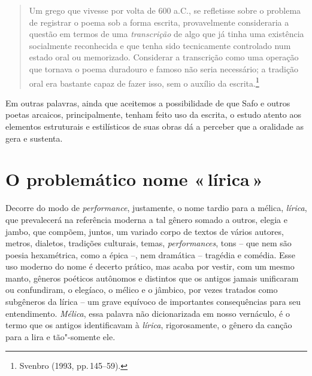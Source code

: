 \begin{quote}
Um grego que vivesse por volta de 600 a.C., se refletisse sobre o problema de
registrar o poema sob a forma escrita, provavelmente consideraria a questão em
termos de uma \textit{transcrição} de algo que já tinha uma existência
socialmente reconhecida e que tenha sido tecnicamente controlado num estado
oral ou memorizado. Considerar a transcrição como uma operação que tornava o
poema duradouro e famoso não seria necessário; a tradição oral era bastante
capaz de fazer isso, sem o auxílio da escrita.\footnote{ Svenbro (1993, pp.\,145--59).}
\end{quote}

Em outras palavras, ainda que aceitemos a possibilidade de que Safo e outros
poetas arcaicos, principalmente, tenham feito uso da escrita, o estudo atento
aos elementos estruturais e estilísticos de suas obras dá a perceber que a oralidade as gera e
sustenta.

\section*{O problemático nome «\,lírica\,»}

Decorre do modo de \textit{performance}, justamente, o nome tardio para a mélica,
\textit{lírica}, que prevalecerá na referência moderna a tal gênero somado a outros, elegia e jambo, que compõem, juntos, um variado corpo de
textos de vários autores, metros, dialetos, tradições culturais, temas,
\textit{performances}, tons -- que nem são poesia hexamétrica, como a
épica --, nem dramática -- tragédia e comédia. Esse uso moderno do nome é decerto
prático, mas acaba por vestir, com um mesmo manto,
gêneros poéticos autônomos e distintos que os antigos jamais unificaram ou confundiram, o elegíaco, o mélico e o jâmbico, por vezes tratados como subgêneros da lírica -- um grave equívoco de importantes consequências para seu entendimento. \textit{Mélica}, essa palavra não
dicionarizada em nosso vernáculo, é o termo que os antigos identificavam à
\textit{lírica}, rigorosamente, o gênero da canção para a lira e tão"-somente ele. 

